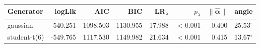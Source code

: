 \begin{tabular}{lrrrrrrr}
\toprule
Generator & logLik & AIC & BIC & LR$_\lambda$ & $p_\lambda$ & $\|\widehat{\bm\alpha}\|$ & angle \\
\midrule
gaussian & -540.251 & 1098.503 & 1130.955 & 17.988 & $<0.001$ & 0.400 & 25.53$^\circ$ \\
student-t(6) & -549.765 & 1117.530 & 1149.982 & 21.634 & $<0.001$ & 0.415 & 13.67$^\circ$ \\
\bottomrule
\end{tabular}
